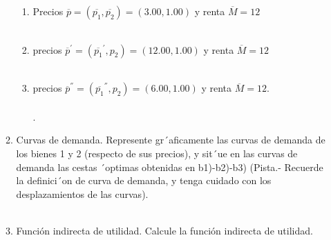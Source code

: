 \begin{enumerate}
\begin{enumerate}[\bfseries a)]
\begin{enumerate}[\bfseries b1)]
		\item Precios $\overline{p} = (\overline{p_1} , \overline{p_2} )=(3.00,1.00)$ y renta $\overline{M} =12$\\\\

		\item precios $\overline{p}^{'} = (\overline{p_1}^{'}, p_2 )=(12.00,1.00)$ y renta $\overline{M}=12$\\\

		\item precios $\overline{p}^{''} = (\overline{p_1}^{''} , p_2 )=(6.00,1.00)$ y renta $\overline{M} =12$.\\\\.

	    \end{enumerate}
	
	\item Curvas de demanda. Represente gr´aficamente las curvas de demanda de los bienes 1 y
2 (respecto de sus precios), y sit´ue en las curvas de demanda las cestas ´optimas obtenidas
en b1)-b2)-b3) (Pista.- Recuerde la definici´on de curva de demanda, y tenga cuidado con los
desplazamientos de las curvas).\\\\
	
	\item Función indirecta de utilidad. Calcule la función indirecta de utilidad.\\\\

    \end{enumerate}

\end{enumerate}
